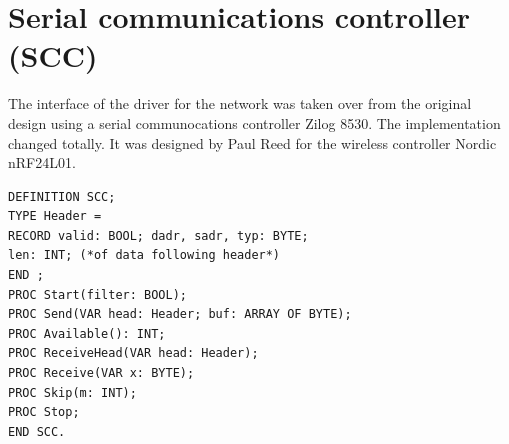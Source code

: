 \section{Serial communications controller (SCC)}
The interface of the driver for the network was taken over from the original design using a serial
communocations controller Zilog 8530. The implementation changed totally. It was designed by
Paul Reed for the wireless controller Nordic nRF24L01.
\begin{verbatim}
DEFINITION SCC;
TYPE Header =
RECORD valid: BOOL; dadr, sadr, typ: BYTE;
len: INT; (*of data following header*)
END ;
PROC Start(filter: BOOL);
PROC Send(VAR head: Header; buf: ARRAY OF BYTE);
PROC Available(): INT;
PROC ReceiveHead(VAR head: Header);
PROC Receive(VAR x: BYTE);
PROC Skip(m: INT);
PROC Stop;
END SCC.
\end{verbatim}
